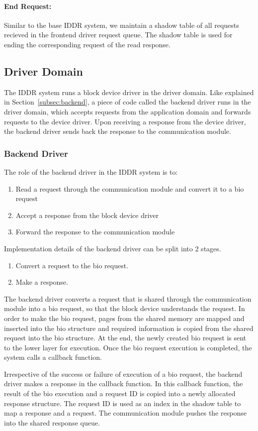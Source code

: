 \paragraph{End Request:}
Similar to the base IDDR system, we maintain a shadow table of all requests recieved in the frontend driver request queue. The shadow table is used for ending the corresponding request of the read response. 

\subsection{Driver Domain}
The IDDR system runs a block device driver in the driver domain. Like explained in Section~\ref{subsec:backend}, a piece of code called the backend driver runs in the driver domain, which accepts requests from the application domain and forwards requests to the device driver. Upon receiving a response from the device driver, the backend driver sends back the response to the communication module.

\subsubsection*{Backend Driver}
The role of the backend driver in the IDDR system is to:
\begin{enumerate}
\item Read a request through the communication module and convert it to a bio request
\item Accept a response from the block device driver
\item Forward the response to the communication module
\end{enumerate}

Implementation details of the backend driver can be split into 2 stages. 
\begin{enumerate}
\item Convert a request to the bio request. 
\item Make a response.
\end{enumerate}

\label{subsec:createbio}
The backend driver converts a request that is shared through the communication module into a bio request, so that the block device understands the request. In order to make the bio request, pages from the shared memory are mapped and inserted into the bio structure and required information is copied from the shared request into the bio structure. At the end, the newly created bio request is sent to the lower layer for execution. Once the bio request execution is completed, the system calls a callback function.

Irrespective of the success or failure of execution of a bio request, the backend driver makes a response in the callback function. In this callback function, the result of the bio execution and a request ID is copied into a newly allocated response structure. The request ID is used as an index in the shadow table to map a response and a request. The communication module pushes the response into the shared response queue.

% 

